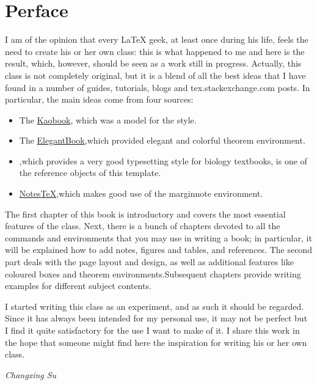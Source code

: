 
\chapter*{Perface}

I am of the opinion that every \LaTeX\xspace geek, at least once during 
his life, feels the need to create his or her own class: this is what 
happened to me and here is the result, which, however, should be seen as 
a work still in progress. Actually, this class is not completely 
original, but it is a blend of all the best ideas that I have found in a 
number of guides, tutorials, blogs and tex.stackexchange.com posts. In 
particular, the main ideas come from  four  sources:

\begin{itemize}
	\item The 
		\href{https://github.com/Tufte-LaTeX/tufte-latex}{Kaobook}, which was a model for the style.
	\item The \href{https://github.com/ElegantLaTeX/ElegantBook}{ElegantBook},which provided  elegant and colorful theorem  environment.
	\item {},which provides a very good typesetting style for biology textbooks, is one of the reference objects of this template.
	\item \href{https://github.com/Adhumunt/NotesTeX}{NotesTeX},which makes good use of the marginnote environment.
\end{itemize}

The first chapter of this book is introductory and covers the most
essential features of the class. Next, there is a bunch of chapters 
devoted to all the commands and environments that you may use in writing 
a book; in particular, it will be explained how to add notes, figures 
and tables, and references. The second part deals with the page layout 
and design, as well as additional features like coloured boxes and 
theorem environments.Subsequent chapters provide writing examples for different subject contents.


I started writing this class as an experiment, and as such it should be 
regarded. Since it has always been intended for my personal use, it may
not be perfect but I find it quite satisfactory for the use I want to 
make of it. I share this work in the hope that someone might find here 
the inspiration for writing his or her own class.

\begin{flushright}
	\textit{Changxing Su}
\end{flushright}

